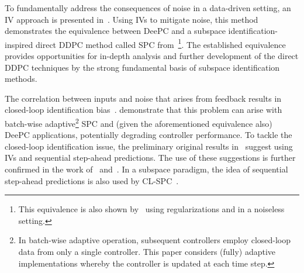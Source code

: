 To fundamentally address the consequences of noise in a data-driven setting, an \ac{IV} approach is presented in~\cite{vanWingerden2022}. %
Using \ac{IVs} to mitigate noise, this method %
demonstrates the equivalence between \ac{DeePC} and a subspace identification-inspired direct \ac{DDPC} method called \ac{SPC} from~\cite{Favoreel1999}\footnote{This equivalence is also shown by~\cite{Fiedler2021} using regularizations and in a noiseless setting.}. The established equivalence provides opportunities for in-depth analysis and further development of the direct \ac{DDPC} techniques by the strong fundamental basis of subspace identification methods. %

The correlation between inputs and noise that arises from feedback results in closed-loop identification bias~\citep{Soderstrom1989a}. %
\cite{Dinkla2023} demonstrate that this problem can arise with batch-wise adaptive\footnote{In batch-wise adaptive operation, subsequent controllers employ closed-loop data from only a single controller. This paper considers (fully) adaptive implementations whereby the controller is updated at each time step.} \ac{SPC} and (given the aforementioned equivalence also) \ac{DeePC} applications, potentially degrading controller performance. To tackle the closed-loop identification issue, the preliminary original results in~\cite{Dinkla2023} suggest using \ac{IVs} and sequential step-ahead predictions. The use of these suggestions is further confirmed in the work of~\cite{Wang2023} and~\cite{Shi2023}. In a subspace paradigm, the idea of sequential step-ahead predictions is also used by \acf{CL-SPC}~\citep{Dong2008}. %

